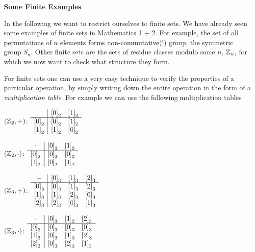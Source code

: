 \pagebreak

\textbf{\large Some Finite Examples}

In the following we want to restrict ourselves to finite sets. We have already
seen some examples of finite sets in Mathematics 1 + 2. For example, the set of
all permutations of $n$ elements forms non-commutative(!) group, the symmetric
group $S_n$. Other finite sets are the sets of residue classes modulo some $n$,
$\mathbb{Z}_n$, for which we now want to check what structure they form.

For finite sets one can use a very easy technique to verify the properties of a
particular operation, by simply writing down the entire operation in the form of
a \emph{multiplication table}. For example we can use the following
multiplication tables

\begin{minipage}[t]{.2\textwidth}
  {$(\mathbb{Z}_2,+)$:}
  $\begin{array}{c|cc}
           +  &{{[0]}_{2}}&{{[1]}_{2}}\\\hline
    {{[0]}_{2}}&{{[0]}_{2}}&{{[1]}_{2}}\\
    {{[1]}_{2}}&{{[1]}_{2}}&{{[0]}_{2}}\\
  \end{array}$
\end{minipage}
\begin{minipage}[t]{.2\textwidth}
  {$(\mathbb{Z}_2,\cdot)$:}
  $\begin{array}{c|cc}
       \cdot  &{{[0]}_{2}}&{{[1]}_{2}}\\\hline
    {{[0]}_{2}}&{{[0]}_{2}}&{{[0]}_{2}}\\
    {{[1]}_{2}}&{{[0]}_{2}}&{{[1]}_{2}}\\
  \end{array}$
\end{minipage}
\begin{minipage}[t]{.3\textwidth}
  {$(\mathbb{Z}_3,+)$:}
  $\begin{array}{c|ccc}
           +  &{{[0]}_{3}}&{{[1]}_{3}}&{{[2]}_{3}}\\\hline
    {{[0]}_{3}}&{{[0]}_{3}}&{{[1]}_{3}}&{{[2]}_{3}}\\
    {{[1]}_{3}}&{{[1]}_{3}}&{{[2]}_{3}}&{{[0]}_{3}}\\
    {{[2]}_{3}}&{{[2]}_{3}}&{{[0]}_{3}}&{{[1]}_{3}}\\
  \end{array}$
\end{minipage}
\begin{minipage}[t]{.3\textwidth}
  {$(\mathbb{Z}_3,\cdot)$:}
  $\begin{array}{c|ccc}
       \cdot  &{{[0]}_{3}}&{{[1]}_{3}}&{{[2]}_{3}}\\\hline
    {{[0]}_{3}}&{{[0]}_{3}}&{{[0]}_{3}}&{{[0]}_{3}}\\
    {{[1]}_{3}}&{{[0]}_{3}}&{{[1]}_{3}}&{{[2]}_{3}}\\
    {{[2]}_{3}}&{{[0]}_{3}}&{{[2]}_{3}}&{{[1]}_{3}}\\
  \end{array}$
\end{minipage}
